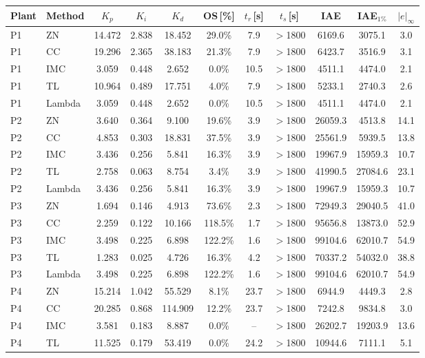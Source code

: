\begin{tabular}{@{}llccccccccc@{}}
\toprule
Plant & Method & $K_p$ & $K_i$ & $K_d$ & OS\,[\%] & $t_r$\,[s] & $t_s$\,[s] & IAE & IAE$_{1\%}$ & $|e|_\infty$ \\
\midrule
P1 & ZN & 14.472 & 2.838 & 18.452 & 29.0\% & 7.9 & $>$1800 & 6169.6 & 3075.1 & 3.0 \\
P1 & CC & 19.296 & 2.365 & 38.183 & 21.3\% & 7.9 & $>$1800 & 6423.7 & 3516.9 & 3.1 \\
P1 & IMC & 3.059 & 0.448 & 2.652 & 0.0\% & 10.5 & $>$1800 & 4511.1 & 4474.0 & 2.1 \\
P1 & TL & 10.964 & 0.489 & 17.751 & 4.0\% & 7.9 & $>$1800 & 5233.1 & 2740.3 & 2.6 \\
P1 & Lambda & 3.059 & 0.448 & 2.652 & 0.0\% & 10.5 & $>$1800 & 4511.1 & 4474.0 & 2.1 \\
\midrule
P2 & ZN & 3.640 & 0.364 & 9.100 & 19.6\% & 3.9 & $>$1800 & 26059.3 & 4513.8 & 14.1 \\
P2 & CC & 4.853 & 0.303 & 18.831 & 37.5\% & 3.9 & $>$1800 & 25561.9 & 5939.5 & 13.8 \\
P2 & IMC & 3.436 & 0.256 & 5.841 & 16.3\% & 3.9 & $>$1800 & 19967.9 & 15959.3 & 10.7 \\
P2 & TL & 2.758 & 0.063 & 8.754 & 3.4\% & 3.9 & $>$1800 & 41990.5 & 27084.6 & 23.1 \\
P2 & Lambda & 3.436 & 0.256 & 5.841 & 16.3\% & 3.9 & $>$1800 & 19967.9 & 15959.3 & 10.7 \\
\midrule
P3 & ZN & 1.694 & 0.146 & 4.913 & 73.6\% & 2.3 & $>$1800 & 72949.3 & 29040.5 & 41.0 \\
P3 & CC & 2.259 & 0.122 & 10.166 & 118.5\% & 1.7 & $>$1800 & 95656.8 & 13873.0 & 52.9 \\
P3 & IMC & 3.498 & 0.225 & 6.898 & 122.2\% & 1.6 & $>$1800 & 99104.6 & 62010.7 & 54.9 \\
P3 & TL & 1.283 & 0.025 & 4.726 & 16.3\% & 4.2 & $>$1800 & 70337.2 & 54032.0 & 38.8 \\
P3 & Lambda & 3.498 & 0.225 & 6.898 & 122.2\% & 1.6 & $>$1800 & 99104.6 & 62010.7 & 54.9 \\
\midrule
P4 & ZN & 15.214 & 1.042 & 55.529 & 8.1\% & 23.7 & $>$1800 & 6944.9 & 4449.3 & 2.8 \\
P4 & CC & 20.285 & 0.868 & 114.909 & 12.2\% & 23.7 & $>$1800 & 7242.8 & 9834.8 & 3.0 \\
P4 & IMC & 3.581 & 0.183 & 8.887 & 0.0\% & -- & $>$1800 & 26202.7 & 19203.9 & 13.6 \\
P4 & TL & 11.525 & 0.179 & 53.419 & 0.0\% & 24.2 & $>$1800 & 10944.6 & 7111.1 & 5.1 \\

\end{tabular}

